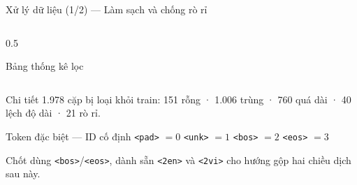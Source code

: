 \documentclass[aspectratio=169, 10pt]{beamer}
\DeclareRobustCommand{\tk}[1]{\texttt{\textless #1\textgreater}}
\begin{document}
\begin{frame}[shrink=10]{Xử lý dữ liệu (1/2) — Làm sạch và chống rò rỉ}
\begin{columns}[T]
\begin{column}{0.5\textwidth}
\begin{block}{Bảng thống kê lọc}
\begin{tabular}{@{}lrrrr@{}}
        \end{tabular}
        \par\vspace{0.4em}
        Chi tiết 1.978 cặp bị loại khỏi train: 151 rỗng · 1.006 trùng ·
        760 quá dài · 40 lệch độ dài · 21 rò rỉ.
      \end{block}
      \begin{block}{Token đặc biệt — ID cố định}
        \footnotesize
        \tk{pad} $=0$ \quad \tk{unk} $=1$ \quad \tk{bos} $=2$ \quad \tk{eos} $=3$
        \par\vspace{0.3em}
        Chốt dùng \tk{bos}/\tk{eos}, dành sẵn \tk{2en} và \tk{2vi} cho hướng gộp hai
        chiều dịch sau này.
      \end{block}
    \end{column}
  \end{columns}
\end{frame}
\end{document}
